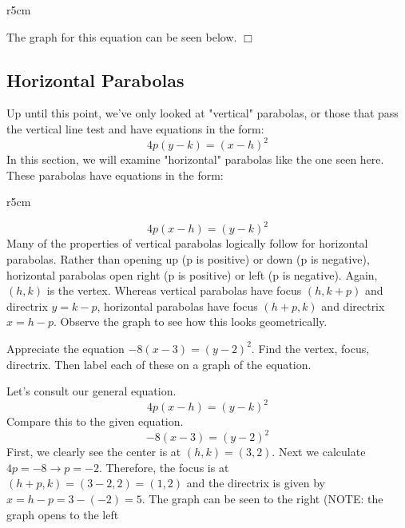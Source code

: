 \documentclass[../book.tex]{subfiles}
\begin{document}
\begin{wrapfigure}{r}{5cm}
\end{wrapfigure}

The graph for this equation can be seen below. $\Box$
\subsection{Horizontal Parabolas}
\noindent Up until this point, we've only looked at "vertical" parabolas, or those that pass the vertical line test and have equations in the form:
$$ 4p(y-k) = (x-h)^2 $$
In this section, we will examine "horizontal" parabolas like the one seen here.  These parabolas have equations in the form:

\begin{wrapfigure}{r}{5cm}
\end{wrapfigure}

$$ 4p(x-h) = (y-k)^2 $$
Many of the properties of vertical parabolas logically follow for horizontal parabolas.  Rather than opening up (p is positive) or down (p is negative), horizontal parabolas open right (p is positive) or left (p is negative).  Again, $(h,k)$ is the vertex.  Whereas vertical parabolas have focus $(h,k+p)$ and directrix $y=k-p$, horizontal parabolas have focus $(h+p,k)$ and directrix $x=h-p$.  Observe the graph to see how this looks geometrically.
\begin{example}
Appreciate the equation $-8(x-3)=(y-2)^2$.  Find the vertex, focus, directrix.  Then label each of these on a graph of the equation.  
\end{example}
\begin{solution}
Let's consult our general equation.
$$ 4p(x-h) = (y-k)^2 $$
Compare this to the given equation.
$$ -8(x-3) = (y-2)^2 $$
First, we clearly see the center is at $(h,k)=(3,2)$.  Next we calculate $4p = -8 \to p = -2$.  Therefore, the focus is at $(h+p,k) = (3-2,2) = (1,2)$ and the directrix is given by $x=h-p=3-(-2)=5$.  The graph can be seen to the right (NOTE: the graph opens to the left 
\end{solution}
\end{document}

